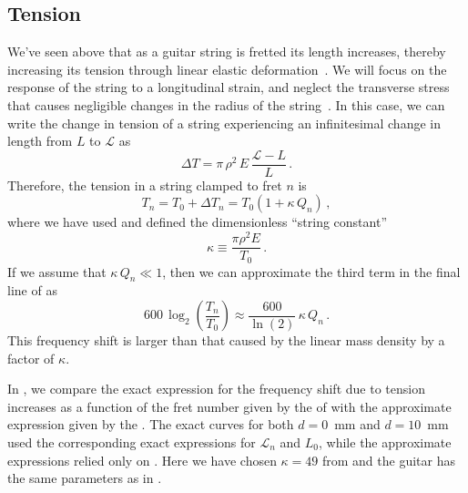  \subsection{Tension\label{sct:model_tension}}
We've seen above that as a guitar string is fretted its length increases, thereby increasing its tension through linear elastic deformation~\cite{ref:landau1986toe}. We will focus on the response of the string to a longitudinal strain, and neglect the transverse stress that causes negligible changes in the radius of the string~\cite{ref:lynchaird2017mpn}. In this case, we can write the change in tension of a string experiencing an infinitesimal change in length from $L$ to $\mathcal{L}$ as
 \begin{equation} \label{eqn:youngs_mod_def}
\Delta T = \pi\, \rho^2\, E\, \frac{\mathcal{L} - L}{L}\, .
 \end{equation}
Therefore, the tension in a string clamped to fret $n$ is
 \begin{equation} \label{eqn:t_n_def}
T_n = T_0 + \Delta T_n = T_0 \left( 1 + \kappa\, Q_n \right)\, ,
 \end{equation}
where we have used  and defined the dimensionless ``string constant''
 \begin{equation}\label{eqn:kappa_def}
\kappa \equiv \frac{\pi \rho^2 E}{T_0}\, .
 \end{equation}
If we assume that $\kappa\, Q_n \ll 1$, then we can approximate the third term in the final line of  as
 \begin{equation} \label{eqn:tension_shift}
600\, \log_2 \left(  \frac{T_n}{T_0} \right) \approx \frac{600}{\ln(2)}\, \kappa\, Q_n\, .
 \end{equation}
This frequency shift is larger than that caused by the linear mass density by a factor of $\kappa$.

In , we compare the exact expression for the frequency shift due to tension increases as a function of the fret number given by the \lhs of  with the approximate expression given by the \rhs. The exact curves for both $d = 0$~mm and $d = 10$~mm used the corresponding exact expressions for $\mathcal{L}_n$ and $L_0$, while the approximate expressions relied only on . Here we have chosen $\kappa = 49$ from  and the guitar has the same parameters as in .

